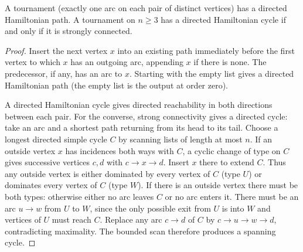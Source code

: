 \begin{theorem}\leavevmode\label{co:tournament}
A tournament (exactly one arc on each pair of distinct vertices) has
a directed Hamiltonian path. A tournament on $n\ge3$ has a directed
Hamiltonian cycle if and only if it is strongly connected.
\end{theorem}
\begin{proof}
Insert the next vertex $x$ into an existing path immediately before the
first vertex to which $x$ has an outgoing arc, appending $x$ if there is
none. The predecessor, if any, has an arc to $x$. Starting with the
empty list gives a directed Hamiltonian path (the empty list is the
output at order zero).

A directed Hamiltonian cycle gives directed reachability in both directions
between each pair. For the converse, strong connectivity gives a directed
cycle: take an arc and a shortest path returning from its head to its tail.
Choose a longest directed simple cycle $C$ by scanning lists of length at
most $n$. If an outside vertex $x$ has incidences both ways with $C$,
a cyclic change of type on $C$ gives successive vertices $c,d$ with
$c\to x\to d$. Insert $x$ there to extend $C$. Thus any outside vertex
is either dominated by every vertex of $C$ (type $U$) or dominates every
vertex of $C$ (type $W$). If there is an outside vertex there must be
both types: otherwise either no arc leaves $C$ or no arc enters it.
There must be an arc $u\to w$ from $U$ to $W$, since the only possible
exit from $U$ is into $W$ and vertices of $U$ must reach $C$. Replace
any arc $c\to d$ of $C$ by $c\to u\to w\to d$, contradicting maximality.
The bounded scan therefore produces a spanning cycle.
\end{proof}
